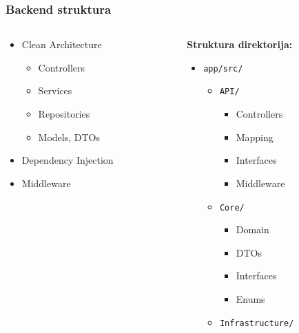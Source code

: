 \documentclass[aspectratio=169]{beamer}
\begin{document}
\begin{frame}
    \frametitle{Backend struktura}
    \begin{columns}
        \begin{column}{0.45\textwidth}
            \begin{itemize}
                \item Clean Architecture
                \begin{itemize}
                    \item Controllers
                    \item Services
                    \item Repositories
                    \item Models, DTOs
                \end{itemize}
                \item Dependency Injection
                \item Middleware
            \end{itemize}
        \end{column}
        \begin{column}{0.6\textwidth}
            \textbf{Struktura direktorija:}
            \begin{itemize}
                \item \texttt{app/src/}
                \begin{itemize}
                    \item \texttt{API/}
                    \begin{itemize}
                        \item Controllers
                        \item Mapping
                        \item Interfaces
                        \item Middleware
                    \end{itemize}
                    \item \texttt{Core/}
                    \begin{itemize}
                        \item Domain
                        \item DTOs
                        \item Interfaces
                        \item Enums
                    \end{itemize}
                    \item \texttt{Infrastructure/}

\end{itemize}
\end{itemize}
\end{column}
\end{columns}
\end{frame}
\end{document}
